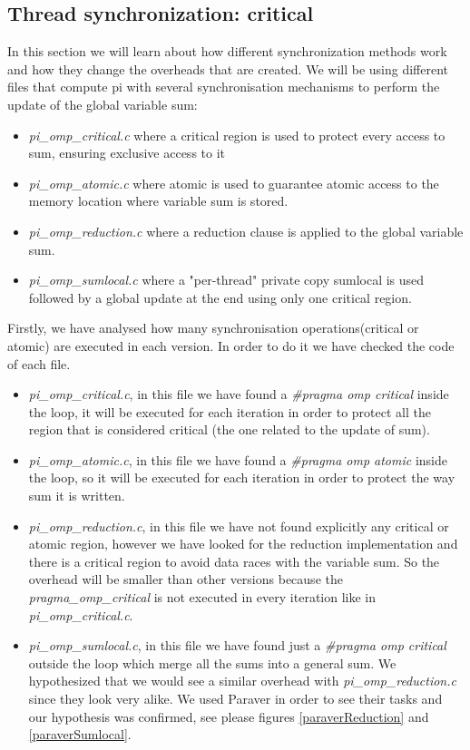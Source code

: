 \documentclass[12]{article}
\begin{document}
\subsection{Thread synchronization: critical}
In this section we will learn about how different synchronization methods work and how they change the overheads that are created. We will be using different files that compute pi with several synchronisation mechanisms to perform the update of the global variable sum:
\begin{itemize}
\item \textit{pi\_omp\_critical.c} where a critical region is used to protect every access to sum, ensuring exclusive access to it
\item \textit{pi\_omp\_atomic.c} where atomic is used to guarantee atomic access to the memory location where variable sum is stored. 
\item \textit{pi\_omp\_reduction.c} where a reduction clause is applied to the global variable sum. 
\item \textit{pi\_omp\_sumlocal.c} where a "per-thread" private copy sumlocal is used followed by a global update at the end using only one critical region. 
\end{itemize} 

Firstly, we have analysed how many synchronisation operations(critical or atomic) are executed in each version.  In order to do it we have checked the code of each file. 

\begin{itemize}
\item  \textit{pi\_omp\_critical.c}, in this file we have found a \textit{\#pragma omp critical} inside the loop, it will be executed for each iteration in order to protect all the region that is considered critical (the one related to the update of sum).
\item  \textit{pi\_omp\_atomic.c}, in this file we have found a \textit{\#pragma omp atomic} inside the loop, so it will be executed for each iteration in order to protect the way sum it is written. 
\item  \textit{pi\_omp\_reduction.c}, in this file we have not found explicitly any critical or atomic region, however we have looked for the reduction implementation and there is a critical region to avoid data races with the variable sum. So the overhead will be smaller than other versions  because the \textit{pragma\_omp\_critical} is not executed in every iteration like in \textit{pi\_omp\_critical.c}.
\item  \textit{pi\_omp\_sumlocal.c}, in this file we have found just a \textit{\#pragma omp critical} outside the loop which merge all the sums into a general sum. We hypothesized that we would see a similar overhead with \textit{pi\_omp\_reduction.c} since they look very alike. We used Paraver in order to see their tasks and our hypothesis was confirmed, see please figures \ref{paraverReduction} and \ref{paraverSumlocal}. 
\end{itemize}
\end{document}
